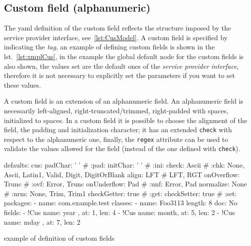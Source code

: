 \subsection{Custom field (alphanumeric)} \label{sub:yaml.cus}
The yaml definition of the custom field reflects the structure 
imposed by the service provider interface, see~\ref{lst:CusModel}.
A custom field is specified by indicating the 
 \textsl{tag}, an example of defining 
custom fields is shown in the lst.~\ref{lst:xmplCus}, in the 
example the global default node for the custom fields is also shown, the values 
set are the default ones of the \textsl{service provider interface}, therefore 
it is not necessary to explicitly set the parameters if you want to set these 
values.

A custom field is an extension of an alphanumeric field. An alphanumeric field 
is necessarily left-aligned, right-truncated/trimmed, right-padded with spaces, 
initialized to spaces. In a custom field it is possible to choose the alignment 
of the field, the padding and initialization character; it has an extended 
\texttt{check} with respect to the alphanumeric one, finally, the \texttt{regex} 
attribute can be used to validate the values allowed for the field (instead of 
the one defined with \texttt{check}).

\begin{elisting}[!htb]
\begin{yamlcode}
defaults:
  cus:
    padChar: ' '        # :pad:
    initChar: ' '       # :ini:
    check: Ascii        # :chk: None, Ascii, Latin1, Valid, Digit, DigitOrBlank
    align: LFT          # LFT, RGT
    onOverflow: Trunc   # :ovf: Error, Trunc
    onUnderflow: Pad    # :unf: Error, Pad
    normalize: None     # :nrm: None, Trim, Trim1
    checkGetter: true   # :get:
    checkSetter: true   # :set:
packages:
  - name: com.example.test
    classes:
      - name: Foo3113
        length: 8
        doc: No
        fields:
          - !Cus { name: year , at: 1, len: 4 }
          - !Cus { name: month, at: 5, len: 2 }
          - !Cus { name: mday , at: 7, len: 2 }
\end{yamlcode}
\caption{example of definition of custom fields}
\label{lst:xmplCus}
\end{elisting}

